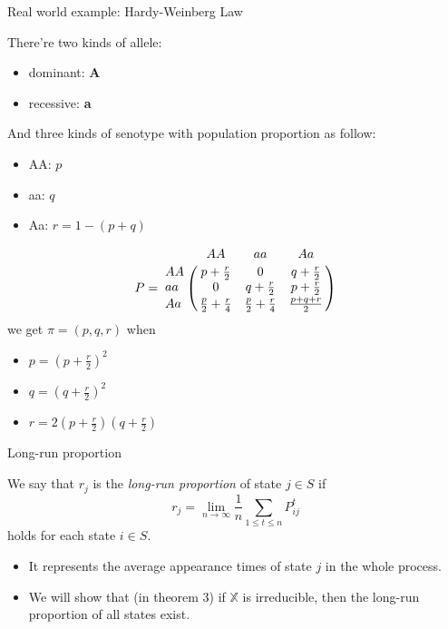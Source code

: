 \documentclass[mathserif]{beamer}
\begin{document}
\begin{frame}{Real world example: Hardy-Weinberg Law}
	\begin{example}
		There're two kinds of allele: 
		\begin{itemize}
			\item dominant: \textbf{A}
			\item recessive: \textbf{a}
		\end{itemize}
		And three kinds of senotype with population proportion as follow:
		\begin{itemize}
			\item AA: $p$
			\item aa: $q$
			\item Aa: $r = 1 - (p + q)$
		\end{itemize}
	\end{example}
\end{frame}

\begin{frame}
	\begin{example}[cont.]
		\[
		P = 
		\bordermatrix{ ~ & AA                      & aa                      & Aa            \cr
			            AA & p+\frac{r}{2}           & 0                       & q+\frac{r}{2} \cr
			            aa & 0                       & q+\frac{r}{2}           & p+\frac{r}{2} \cr
			            Aa & \frac{p}{2}+\frac{r}{4} & \frac{p}{2}+\frac{r}{4} & \frac{p+q+r}{2} \cr}
		\]
		we get $\pi = (p, q, r)$ when
		\begin{itemize}
			\item $p = {\left( p + \frac{r}{2} \right)}^2$
			\item $q = {\left( q + \frac{r}{2} \right)}^2$
			\item $r = 2 \left( p + \frac{r}{2} \right)\left( q + \frac{r}{2} \right)$
		\end{itemize}
	\end{example}
\end{frame}

\begin{frame}{Long-run proportion}
	\begin{definition}
		We say that $r_j$ is the \textit{long-run proportion} of state $j \in S$ if
		\[
		r_j = \lim_{n\to\infty} \frac{1}{n} \sum_{1 \leq t \leq n} P^t_{ij}
		\]
		holds for each state $i \in S$.
	\end{definition}
	\begin{itemize}
		\item It represents the average appearance times of state $j$ in the whole process.
		\item We will show that (in theorem 3) if $\mathbb{X}$ is irreducible, then the long-run proportion of all states exist.
	\end{itemize}
\end{frame}
\end{document}
